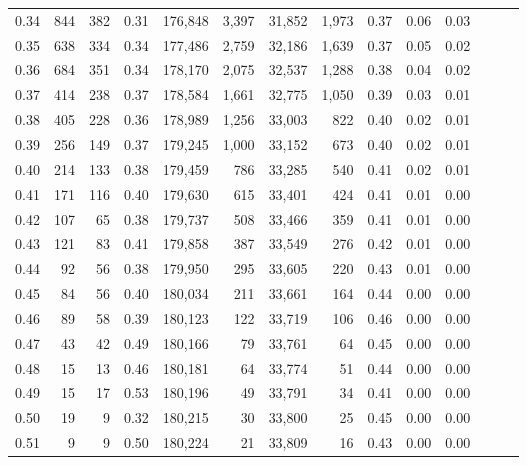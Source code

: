 \begin{tabular}{rrrrrrrrrrrrrr}
0.34 &     844 &    382 &  0.31 &  176,848 &    3,397 &  31,852 &   1,973 &  0.37 &  0.06 &      0.03 \\
0.35 &     638 &    334 &  0.34 &  177,486 &    2,759 &  32,186 &   1,639 &  0.37 &  0.05 &      0.02 \\
0.36 &     684 &    351 &  0.34 &  178,170 &    2,075 &  32,537 &   1,288 &  0.38 &  0.04 &      0.02 \\
0.37 &     414 &    238 &  0.37 &  178,584 &    1,661 &  32,775 &   1,050 &  0.39 &  0.03 &      0.01 \\
0.38 &     405 &    228 &  0.36 &  178,989 &    1,256 &  33,003 &     822 &  0.40 &  0.02 &      0.01 \\
0.39 &     256 &    149 &  0.37 &  179,245 &    1,000 &  33,152 &     673 &  0.40 &  0.02 &      0.01 \\
0.40 &     214 &    133 &  0.38 &  179,459 &      786 &  33,285 &     540 &  0.41 &  0.02 &      0.01 \\
0.41 &     171 &    116 &  0.40 &  179,630 &      615 &  33,401 &     424 &  0.41 &  0.01 &      0.00 \\
0.42 &     107 &     65 &  0.38 &  179,737 &      508 &  33,466 &     359 &  0.41 &  0.01 &      0.00 \\
0.43 &     121 &     83 &  0.41 &  179,858 &      387 &  33,549 &     276 &  0.42 &  0.01 &      0.00 \\
0.44 &      92 &     56 &  0.38 &  179,950 &      295 &  33,605 &     220 &  0.43 &  0.01 &      0.00 \\
0.45 &      84 &     56 &  0.40 &  180,034 &      211 &  33,661 &     164 &  0.44 &  0.00 &      0.00 \\
0.46 &      89 &     58 &  0.39 &  180,123 &      122 &  33,719 &     106 &  0.46 &  0.00 &      0.00 \\
0.47 &      43 &     42 &  0.49 &  180,166 &       79 &  33,761 &      64 &  0.45 &  0.00 &      0.00 \\
0.48 &      15 &     13 &  0.46 &  180,181 &       64 &  33,774 &      51 &  0.44 &  0.00 &      0.00 \\
0.49 &      15 &     17 &  0.53 &  180,196 &       49 &  33,791 &      34 &  0.41 &  0.00 &      0.00 \\
0.50 &      19 &      9 &  0.32 &  180,215 &       30 &  33,800 &      25 &  0.45 &  0.00 &      0.00 \\
0.51 &       9 &      9 &  0.50 &  180,224 &       21 &  33,809 &      16 &  0.43 &  0.00 &      0.00 \\

\end{tabular}
